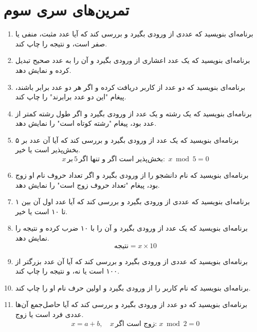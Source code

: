 \documentclass[b5paper,12pt]{article}
\begin{document}
	
	\newpage
	\section*{تمرین‌های سری سوم}
	\begin{enumerate}
		
		\item برنامه‌ای بنویسید که عددی از ورودی بگیرد و بررسی کند که آیا عدد مثبت، منفی یا صفر است، و نتیجه را چاپ کند.
		
		\item برنامه‌ای بنویسید که یک عدد اعشاری از ورودی بگیرد و آن را به عدد صحیح تبدیل کرده و نمایش دهد.
		
		\item برنامه‌ای بنویسید که دو عدد از کاربر دریافت کرده و اگر هر دو عدد برابر باشند، پیغام "این دو عدد برابرند" را چاپ کند.
		
		\item برنامه‌ای بنویسید که یک رشته و یک عدد از ورودی بگیرد و اگر طول رشته کمتر از عدد بود، پیغام "رشته کوتاه است" را نمایش دهد.
		
		\item برنامه‌ای بنویسید که یک عدد از ورودی بگیرد و بررسی کند که آیا آن عدد بر ۵ بخش‌پذیر است یا خیر.
		\[
		x \, \text{بر} \, 5 \, \text{بخش‌پذیر است اگر و تنها اگر: } \, x \bmod 5 = 0
		\]
		
		\item برنامه‌ای بنویسید که نام دانشجو را از ورودی بگیرد و اگر تعداد حروف نام او زوج بود، پیغام "تعداد حروف زوج است" را نمایش دهد.
		
		\item برنامه‌ای بنویسید که عددی از ورودی بگیرد و بررسی کند که آیا عدد اول آن بین ۱ تا ۱۰ است یا خیر.
		
		\item برنامه‌ای بنویسید که یک عدد از ورودی بگیرد و آن را با ۱۰ ضرب کرده و نتیجه را نمایش دهد.
		\[
		\text{نتیجه} = x \times 10
		\]
		
		\item برنامه‌ای بنویسید که عددی از ورودی بگیرد و بررسی کند که آیا آن عدد بزرگتر از ۱۰۰ است یا نه، و نتیجه را چاپ کند.
		
		\item برنامه‌ای بنویسید که نام کاربر را از ورودی بگیرد و اولین حرف نام او را چاپ کند.
		
		\item برنامه‌ای بنویسید که دو عدد از ورودی بگیرد و بررسی کند که آیا حاصل‌جمع آن‌ها عددی فرد است یا زوج.
		\[
		x = a + b, \quad x \, \text{زوج است اگر: } x \bmod 2 = 0
		\]
		

\end{enumerate}
\end{document}
